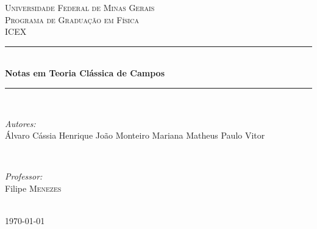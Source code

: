 \documentclass[12pt,a4paper]{article}
\begin{document}
\begin{titlepage}

    \newcommand{\HRule}{\rule{\linewidth}{0.5mm}} %
    
    \center %
    \textsc{\LARGE Universidade Federal de Minas Gerais}\\[1.5cm] %
    \textsc{\Large Programa de Graduação em Física}\\[0.5cm] %
    \textsc{\large ICEX}\\[0.5cm] %
    \vfill
    \HRule \\[0.4cm]
    { \huge \bfseries Notas em Teoria Clássica de Campos}\\[0.4cm] %
    \HRule \\[1.5cm]
    \begin{minipage}{0.4\textwidth}
    \begin{flushleft} \large
    \emph{Autores:}\\
    Álvaro \quad Cássia \quad Henrique \quad João Monteiro \quad Mariana \quad Matheus \quad Paulo Vitor %
    \end{flushleft}
    \end{minipage}
    ~
    \begin{minipage}{0.4\textwidth}
    \begin{flushright} \large
    \emph{Professor:} \\
    Filipe \textsc{Menezes} 
    \end{flushright}
    \end{minipage}\\[2cm]
    \vspace*{6cm}
    {\large \today}\\[2cm] 
\end{titlepage}
\end{document}
